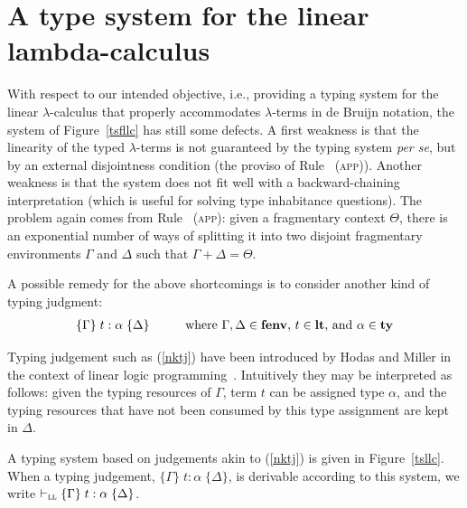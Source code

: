 \documentclass[submission,creativecommons]{eptcs}
\newcommand{\tytm}[4]{\{#1\}\;#2:#3\;\{#4\}}
\newcommand{\der}[1]{\vdash_{#1}}
\newcommand{\Sll}{{\textsc{ll}}}
\newcommand{\ltm}{\mathord{\mathbf{lt}}}
\newcommand{\ty}{\mathord{\mathbf{ty}}}
\newcommand{\fenv}{\mathord{\mathbf{fenv}}}
\begin{document}
\section{A type system for the linear lambda-calculus}\label{Sec4}

With respect to our intended objective, i.e., providing a typing system for the linear
$\lambda$-calculus that properly accommodates $\lambda$-terms in de Bruijn notation,
the system of Figure~\ref{tsfllc} has still some defects. A first weakness is that the linearity of the typed
$\lambda$-terms is not guaranteed
by the typing system \textit{per se}, but by an external disjointness condition (the proviso of
Rule~ (\textsc{app})). Another weakness is that the system does not fit well with a backward-chaining
interpretation (which is useful for solving type inhabitance questions). The problem again comes from
Rule~ (\textsc{app}): given a fragmentary context $\Theta$, there is an exponential number of ways of splitting
it into two disjoint fragmentary environments $\Gamma$ and $\Delta$ such that $\Gamma+\Delta=\Theta$.

A possible remedy for the above shortcomings is to consider another kind of typing judgment:
\begin{align}\label{nktj}
	\tytm{\Gamma}{t}{\alpha}{\Delta} \text{\hspace{1cm}where $\Gamma,\Delta\in\fenv$, $t\in\ltm$, and $\alpha\in\ty$}
\end{align}

Typing judgement such as (\ref{nktj}) have been introduced by Hodas and Miller in the context of linear logic
programming~\cite{Hodas-Miller}.
Intuitively they may be interpreted as follows: given the typing resources of $\Gamma$, term $t$ can be assigned
type $\alpha$, and the typing resources that have not been consumed by this type assignment are kept in
$\Delta$.

A typing system based on judgements akin to (\ref{nktj}) is given in Figure~\ref{tsllc}.
When a typing judgement, $\tytm{\Gamma}{t}{\alpha}{\Delta}$, is derivable according to this system,
we write $\der{\Sll} \tytm{\Gamma}{t}{\alpha}{\Delta}$.
\end{document}
